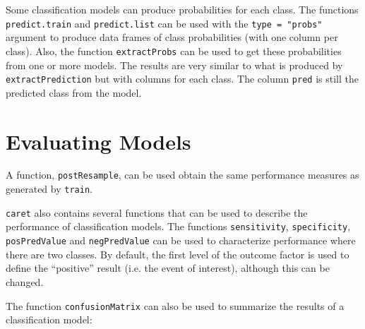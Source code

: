 \documentclass[12pt]{article}
\begin{document}
Some classification models can produce probabilities for each class. The functions \texttt{predict.train} and \texttt{predict.list} can be used with the \texttt{type = "probs"} argument to produce data frames of class probabilities (with one column per class). Also, the function \texttt{extractProbs} can be used to get these probabilities from one or more models. The results are very similar to what is produced by \texttt{extractPrediction} but with columns for each class. The column \texttt{pred} is still the predicted class from the model. 


\section{Evaluating Models}

A function, \texttt{postResample}, can be used obtain the same performance measures as generated by \texttt{train}. 

\texttt{caret} also contains several functions that can be used to describe the performance of classification models. The functions \texttt{sensitivity}, \texttt{specificity}, \texttt{posPredValue} and \texttt{negPredValue} can be used to characterize performance where there are two classes. By default, the first level of the outcome factor is used to define the ``positive'' result (i.e. the event of interest), although this can be changed. 

The function \texttt{confusionMatrix} can also be used to summarize the results of a classification model:
\end{document}
